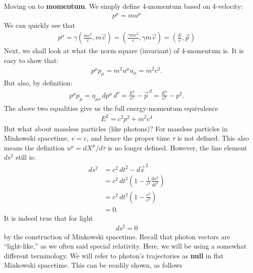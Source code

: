 \documentclass{book}
\theoremstyle{definition}
\begin{document}
Moving on to \textbf{momentum}. We simply define 4-momentum based on 4-velocity:
\begin{align*}
\boxed{p^\mu = mu^\mu}
\end{align*}
We can quickly see that
\begin{align*}
\boxed{p^\mu = \gamma\left(\frac{mc^2}{c}, m\vec{v} \right) = \left( \frac{\gamma m c^2}{c}, \gamma m \vec{v} \right) = \left(\frac{E}{c},\vec{p} \right) }  
\end{align*}
Next, we shall look at what the norm square (invariant) of 4-momentum is. It is easy to show that:
\begin{align*}
p^\mu p_\mu = m^2 u^\mu u_\mu = m^2c^2.
\end{align*}
But also, by definition:
\begin{align*}
p^\mu p_\mu = \eta_{\mu\nu}\,dp^\mu\,d^\nu = \frac{E^2}{c^2} - \vec{p}^{\,d} = \frac{E^2}{c^2} - p^2.
\end{align*}
The above two equalities give us the full energy-momentum equivalence
\begin{align*}
\boxed{E^2 = c^2p^2 + m^2 c^4}
\end{align*}
But what about massless particles (like photons)? For massless particles in Minkowski spacetime, $v=c$, and hence the proper time $\tau$ is not defined. This also means the definition $u^\mu = dX^\mu/d\tau$ is no longer defined. However, the line element $ds^2$ still is:
\begin{align*}
ds^2 &= c^2\,dt^2 - d\vec{x}^{\,2}\\
&=c^2\,dt^2\left( 1 - \frac{1}{c^2}\frac{dx^2}{dt^2}\right)\\
&=c^2\,dt^2\left(1 - \frac{c^2}{c^2} \right)\\
&=0. 
\end{align*}
It is indeed true that for light
\begin{align*}
\boxed{ds^2 = 0}
\end{align*}
by the construction of Minkowski spacetime. Recall that photon vectors are ``light-like,'' as we often said special relativity. Here, we will be using a somewhat different terminology. We will refer to photon's trajectories as \textbf{null} in flat Minkowski spacetime. This can be readily shown, as follows\\
\end{document}
